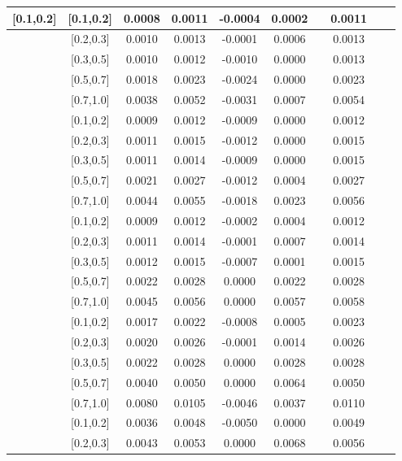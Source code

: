 \begin{table}[H]
\begin{tabular}{|c| c| c| c| c| c| c| c| c| c|}
[0.1,0.2]	&	[0.1,0.2]	&	0.0008	&	0.0011	&	-0.0004	&	0.0002	&		&	0.0011	\\ \hline
[0.1,0.2]	&	[0.2,0.3]	&	0.0010	&	0.0013	&	-0.0001	&	0.0006	&		&	0.0013	\\ \hline
[0.1,0.2]	&	[0.3,0.5]	&	0.0010	&	0.0012	&	-0.0010	&	0.0000	&		&	0.0013	\\ \hline
[0.1,0.2]	&	[0.5,0.7]	&	0.0018	&	0.0023	&	-0.0024	&	0.0000	&		&	0.0023	\\ \hline
[0.1,0.2]	&	[0.7,1.0]	&	0.0038	&	0.0052	&	-0.0031	&	0.0007	&		&	0.0054	\\ \hline
[0.2,0.3]	&	[0.1,0.2]	&	0.0009	&	0.0012	&	-0.0009	&	0.0000	&		&	0.0012	\\ \hline
[0.2,0.3]	&	[0.2,0.3]	&	0.0011	&	0.0015	&	-0.0012	&	0.0000	&		&	0.0015	\\ \hline
[0.2,0.3]	&	[0.3,0.5]	&	0.0011	&	0.0014	&	-0.0009	&	0.0000	&		&	0.0015	\\ \hline
[0.2,0.3]	&	[0.5,0.7]	&	0.0021	&	0.0027	&	-0.0012	&	0.0004	&		&	0.0027	\\ \hline
[0.2,0.3]	&	[0.7,1.0]	&	0.0044	&	0.0055	&	-0.0018	&	0.0023	&		&	0.0056	\\ \hline
[0.3,0.5]	&	[0.1,0.2]	&	0.0009	&	0.0012	&	-0.0002	&	0.0004	&		&	0.0012	\\ \hline
[0.3,0.5]	&	[0.2,0.3]	&	0.0011	&	0.0014	&	-0.0001	&	0.0007	&		&	0.0014	\\ \hline
[0.3,0.5]	&	[0.3,0.5]	&	0.0012	&	0.0015	&	-0.0007	&	0.0001	&		&	0.0015	\\ \hline
[0.3,0.5]	&	[0.5,0.7]	&	0.0022	&	0.0028	&	0.0000	&	0.0022	&		&	0.0028	\\ \hline
[0.3,0.5]	&	[0.7,1.0]	&	0.0045	&	0.0056	&	0.0000	&	0.0057	&		&	0.0058	\\ \hline
[0.5,0.7]	&	[0.1,0.2]	&	0.0017	&	0.0022	&	-0.0008	&	0.0005	&		&	0.0023	\\ \hline
[0.5,0.7]	&	[0.2,0.3]	&	0.0020	&	0.0026	&	-0.0001	&	0.0014	&		&	0.0026	\\ \hline
[0.5,0.7]	&	[0.3,0.5]	&	0.0022	&	0.0028	&	0.0000	&	0.0028	&		&	0.0028	\\ \hline
[0.5,0.7]	&	[0.5,0.7]	&	0.0040	&	0.0050	&	0.0000	&	0.0064	&		&	0.0050	\\ \hline
[0.5,0.7]	&	[0.7,1.0]	&	0.0080	&	0.0105	&	-0.0046	&	0.0037	&		&	0.0110	\\ \hline
[0.7,1.0]	&	[0.1,0.2]	&	0.0036	&	0.0048	&	-0.0050	&	0.0000	&		&	0.0049	\\ \hline
[0.7,1.0]	&	[0.2,0.3]	&	0.0043	&	0.0053	&	0.0000	&	0.0068	&		&	0.0056	\\ \hline

\end{tabular}
\end{table}
